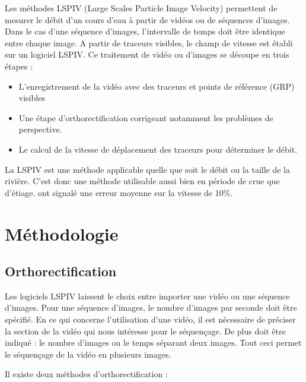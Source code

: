 \documentclass[
]{article}
\providecommand{\tightlist}{%
  \setlength{\itemsep}{0pt}\setlength{\parskip}{0pt}}
\begin{document}
Les méthodes LSPIV (Large Scales Particle Image Velocity) permettent de mesurer le débit d'un cours d'eau à partir de vidéos ou de séquences d'images. Dans le cas d'une séquence d'images, l'intervalle de temps doit être identique entre chaque image. A partir de traceurs visibles, le champ de vitesse est établi sur un logiciel LSPIV. Ce traitement de vidéo ou d'images se découpe en trois étapes :

\begin{itemize}
\tightlist
\item
  L'enregistrement de la vidéo avec des traceurs et points de référence (GRP) visibles
\item
  Une étape d'orthorectification corrigeant notamment les problèmes de perspective.
\item
  Le calcul de la vitesse de déplacement des traceurs pour déterminer le débit.
\end{itemize}

La LSPIV est une méthode applicable quelle que soit le débit ou la taille de la rivière. C'est donc une méthode utilisable aussi bien en période de crue que d'étiage. \citep{muste_large-scale_2008} ont signalé une erreur moyenne sur la vitesse de 10\%.

\hypertarget{principle}{%
\section{Méthodologie}\label{principle}}

\hypertarget{orthorectification}{%
\subsection{Orthorectification}\label{orthorectification}}

Les logiciels LSPIV laissent le choix entre importer une vidéo ou une séquence d'images.
Pour une séquence d'images, le nombre d'images par seconde doit être spécifié.
En ce qui concerne l'utilisation d'une vidéo, il est nécessaire de préciser la section de la vidéo qui nous intéresse pour le séquençage. De plus doit être indiqué : le nombre d'images ou le temps séparant deux images. Tout ceci permet le séquençage de la vidéo en plusieurs images.

Il existe deux méthodes d'orthorectification :
\end{document}
